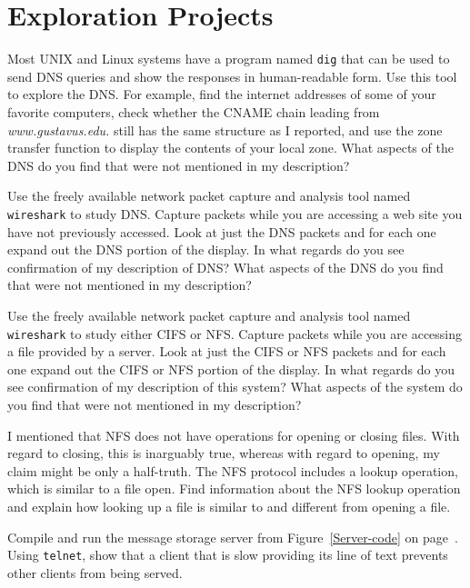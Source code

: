 \section*{Exploration Projects}
\begin{chapterEnumerate}
\item
\label{dns-exploration-dig}
Most UNIX and Linux systems have a program named \verb|dig| that can
be used to send DNS queries and show the responses in human-readable
form.  Use this tool to explore the DNS.  For example, find the
internet addresses of some of your favorite computers, check whether
the CNAME chain leading from \textit{www.gustavus.edu.} still has the
same structure as I reported, and use the zone transfer function to
display the contents of your local zone.  What aspects of the DNS
do you find that were not mentioned in my description?

\item
\label{dns-exploration-ethereal}
Use the freely available network packet capture and analysis tool
named \verb|wireshark| to study DNS.  Capture packets while you are
accessing a web site you have not previously accessed.  Look at just
the DNS packets and for each one expand out the DNS portion of the
display.  In what regards do you see confirmation of my description of
DNS?  What aspects of the DNS do you find that were not mentioned in
my description?

\item
Use the freely available network packet capture and analysis tool
named \verb|wireshark| to study either CIFS or NFS.  Capture packets
while you are accessing a file provided by a server.  Look at
just the CIFS or NFS packets and for each one expand out the CIFS or
NFS portion of the display.  In what regards do you see confirmation
of my description of this system?  What aspects of the system do you find that
were not mentioned in my description?

\item
I mentioned that NFS does not have operations for opening or closing
files.  With regard to closing, this is inarguably true, whereas with
regard to opening, my claim might be only a half-truth.  The NFS
protocol includes a lookup operation, which is similar to a file
open.  Find information about the NFS lookup operation and explain
how looking up a file is similar to and different from opening a file.

\item
\label{single-threaded-server-demo}
Compile and run the message storage server from
Figure~\ref{Server-code} on page~\pageref{Server-code}.
Using \verb|telnet|, show that a client that is slow
providing its line of text prevents other clients from being
served.


\end{chapterEnumerate}
